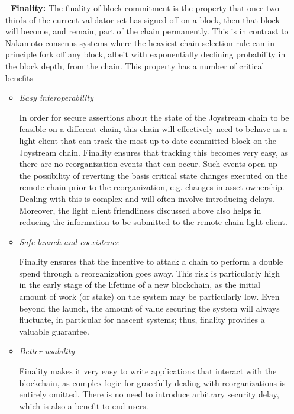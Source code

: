 \documentclass{article}
\begin{document}
\begin{itemize}
    \item[-] \textbf{Finality:} The finality of block commitment is the property that once two-thirds of the current validator set has signed off on a block, then that block will become, and remain, part of the chain permanently. This is in contrast to Nakamoto consenus systems where the heaviest chain selection rule can in principle fork off any block, albeit with exponentially declining probability in the block depth, from the chain. This property has a number of critical benefits

    \begin{itemize}

        \item \textit{Easy interoperability}

        In order for secure assertions about the state of the Joystream chain to be feasible on a different chain, this chain will effectively need to behave as a light client that can track the most up-to-date committed block on the Joystream chain. Finality ensures that tracking this becomes very easy, as there are no reorganization events that can occur. Such events open up the possibility of reverting the basis critical state changes executed on the remote chain prior to the reorganization, e.g. changes in asset ownership. Dealing with this is complex and will often involve introducing delays. Moreover, the light client friendliness discussed above also helps in reducing the information to be submitted to the remote chain light client.

        \item \textit{Safe launch and coexistence}

        Finality ensures that the incentive to attack a chain to perform a double spend through a reorganization goes away. This risk is particularly high in the early stage of the lifetime of a new blockchain, as the initial amount of work (or stake) on the system may be particularly low. Even beyond the launch, the amount of value securing the system will always fluctuate, in particular for nascent systems;  thus, finality provides a valuable guarantee.

        \item \textit{Better usability}

        Finality makes it very easy to write applications that interact with the blockchain, as complex logic for gracefully dealing with reorganizations is entirely omitted. There is no need to introduce arbitrary security delay, which is also a benefit to end users.

    \end{itemize}

\end{itemize}
\end{document}
